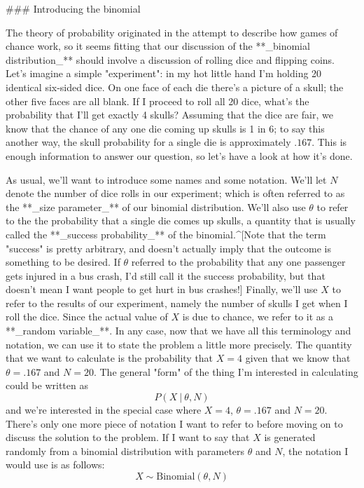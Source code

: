 ### Introducing the binomial

The theory of probability originated in the attempt to describe how games of chance work, so it seems fitting that our discussion of the **_binomial distribution_** should involve a discussion of rolling dice and flipping coins. Let's imagine a simple "experiment": in my hot little hand I'm holding 20 identical six-sided dice. On one face of each die there's a picture of a skull; the other five faces are all blank. If I proceed to roll all 20 dice, what's the probability that I'll get exactly 4 skulls? Assuming that the dice are fair, we know that the chance of any one die coming up skulls is 1 in 6; to say this another way, the skull probability for a single die is approximately $.167$. This is enough information to answer our question, so let's have a look at how it's done. 

As usual, we'll want to introduce some names and some notation. We'll let $N$ denote the number of dice rolls in our experiment; which is often referred to as the **_size parameter_** of our binomial distribution. We'll also use $\theta$ to refer to the the probability that a single die comes up skulls, a quantity that is usually called the **_success probability_** of the binomial.^[Note that the term "success" is pretty arbitrary, and doesn't actually imply that the outcome is something to be desired. If $\theta$ referred to the probability that any one passenger gets injured in a bus crash, I'd still call it the success probability, but that doesn't mean I want people to get hurt in bus crashes!] Finally, we'll use $X$ to refer to the results of our experiment, namely the number of skulls I get when I roll the dice. Since the actual value of $X$ is due to chance, we refer to it as a **_random variable_**. In any case, now that we have all this terminology and notation, we can use it to state the problem a little more precisely. The quantity that we want to calculate is the probability that $X = 4$ given that we know that $\theta = .167$ and $N=20$. The general "form" of the thing I'm interested in calculating could be written as 
$$
P(X \ | \ \theta, N)
$$
and we're interested in the special case where $X=4$, $\theta = .167$ and $N=20$. 
There's only one more piece of notation I want to refer to before moving on to discuss the solution to the problem. If I want to say that $X$ is generated randomly from a binomial distribution with parameters $\theta$ and $N$, the notation I would use is as follows:
$$
X \sim \mbox{Binomial}(\theta, N)
$$ 

